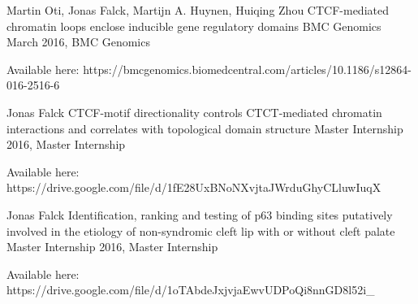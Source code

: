 

\begin{cventries}

\cventry
  { Martin Oti, Jonas Falck, Martijn A. Huynen, Huiqing Zhou }
  { CTCF-mediated chromatin loops enclose inducible gene regulatory domains } %
  { BMC Genomics }
  { March 2016, BMC Genomics } %
  {    
  \begin{cvitems} %
    \item {Available here: https://bmcgenomics.biomedcentral.com/articles/10.1186/s12864-016-2516-6 }
  \end{cvitems}
  }
\cventry
  { Jonas Falck }
  { CTCF-motif directionality controls CTCT-mediated chromatin interactions and correlates with topological domain structure } %
  { Master Internship }
  { 2016, Master Internship } %
  {    
  \begin{cvitems} %
    \item {Available here: https://drive.google.com/file/d/1fE28UxBNoNXvjtaJWrduGhyCLluwIuqX }
  \end{cvitems}
  }
\cventry
  { Jonas Falck }
  { Identification, ranking and testing of p63 binding sites putatively involved in the etiology of non-syndromic cleft lip with or without cleft palate } %
  { Master Internship }
  { 2016, Master Internship } %
  {    
  \begin{cvitems} %
    \item {Available here: https://drive.google.com/file/d/1oTAbdeJxjvjaEwvUDPoQi8nnGD8l52i_ }
  \end{cvitems}
  }

\end{cventries}